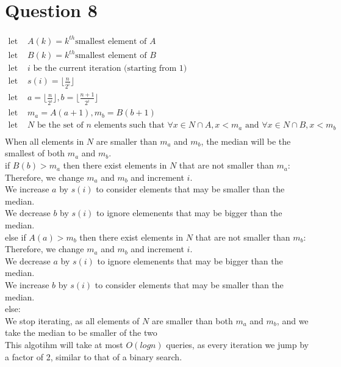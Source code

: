 \documentclass{article}
\begin{document}
\section*{Question 8}
\begin{align*}
    \text{let } &A(k) = k^{th} \text{smallest element of } A\\
    \text{let } &B(k) = k^{th} \text{smallest element of } B\\
    \text{let } &i \text{ be the current iteration (starting from 1)}\\
    \text{let } &s(i) = \lfloor\frac{n}{2^i}\rfloor\\
    \text{let } &a =\lfloor\frac{n}{2^i}\rfloor, b = \lfloor\frac{n+1}{2^i}\rfloor \\
    \text{let } &m_a = A(a + 1), m_b = B(b + 1)\\
    \text{let } &N \text{ be the set of } n \text{ elements such that } \forall x \in N \cap A, x < m_a \text{ and } \forall x \in N \cap B, x < m_b\\
\end{align*}
When all elements in $N$ are smaller than $m_a$ and $m_b$, the median will be the smallest of both $m_a$ and $m_b$.\\

\noindent
if $B(b) > m_a$ then there exist elements in $N$ that are not smaller than $m_a$:\\
    \indent Therefore, we change $m_a$ and $m_b$ and increment $i$.\\
    \indent We increase $a$ by $s(i)$ to consider elements that may be smaller than the median.\\
    \indent We decrease $b$ by $s(i)$ to ignore elemenents that may be bigger than the median.\\
else if $A(a) > m_b$ then there exist elements in $N$ that are not smaller than $m_b$:\\
    \indent Therefore, we change $m_a$ and $m_b$ and increment $i$.\\
    \indent We decrease $a$ by $s(i)$ to ignore elemenents that may be bigger than the median.\\
    \indent We increase $b$ by $s(i)$ to consider elements that may be smaller than the median.\\
else:\\
    \indent We stop iterating, as all elements of $N$ are smaller than both $m_a$ and $m_b$, and we take the median to be smaller of the two\\

\noindent This algotihm will take at most $O(logn)$ queries, as every iteration we jump by a factor of 2, similar to that of a binary search.
\end{document}
